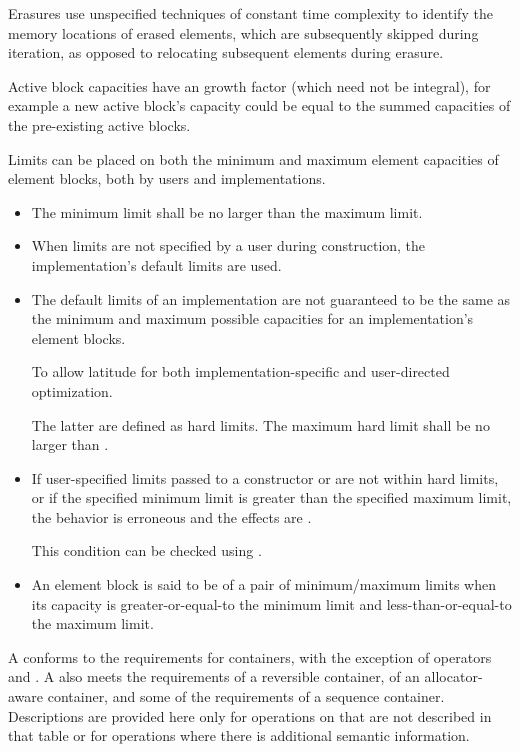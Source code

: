 \pnum
Erasures use unspecified techniques of constant time complexity
to identify the memory locations of erased elements,
which are subsequently skipped during iteration,
as opposed to relocating subsequent elements during erasure.

\pnum
Active block capacities have
an  growth factor
(which need not be integral),
for example a new active block's capacity could be equal to
the summed capacities of the pre-existing active blocks.

\pnum
Limits can be placed on
both the minimum and maximum element capacities of element blocks,
both by users and implementations.
\begin{itemize}
\item
The minimum limit shall be no larger than the maximum limit.
\item
When limits are not specified by a user during construction,
the implementation's default limits are used.
\item
The default limits of an implementation are not guaranteed to be the same as
the minimum and maximum possible capacities
for an implementation's element blocks.
\begin{note}
To allow latitude for
both implementation-specific and user-directed optimization.
\end{note}
The latter are defined as hard limits.
The maximum hard limit shall be no larger than
.
\item
If user-specified limits passed to
a  constructor or 
are not within hard limits, or
if the specified minimum limit is greater than the specified maximum limit,
the behavior is erroneous and the effects are
.
\begin{tailnote}
This condition can be checked using .
\end{tailnote}
\item
An element block is said to be 
of a pair of minimum/maximum limits
when its capacity is greater-or-equal-to the minimum limit and
less-than-or-equal-to the maximum limit.
\end{itemize}

\pnum
A  conforms to
the requirements for containers,
with the exception of operators \tcode{==} and \tcode{!=}.
A  also meets the requirements
of a reversible container,
of an allocator-aware container, and
some of the requirements of a sequence container.
Descriptions are provided here only for operations on 
that are not described in that table or for operations
where there is additional semantic information.

